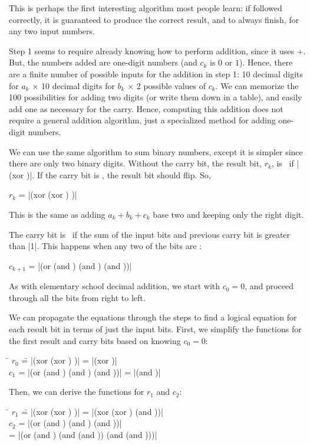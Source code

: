 \begin{schemeregion}
This is perhaps the first interesting algorithm most people learn: if followed correctly, it is guaranteed to produce the correct result, and to always finish, for any two input numbers.

Step 1 seems to require already knowing how to perform addition, since it uses $+$.  But, the numbers added are one-digit numbers (and $c_k$ is $0$ or $1$).  Hence, there are a finite number of possible inputs for the addition in step 1: 10 decimal digits for $a_k$ $\times$ 10 decimal digits for $b_k$ $\times$ 2 possible values of $c_k$.  We can memorize the 100 possibilities for adding two digits (or write them down in a table), and easily add one as necessary for the carry.  Hence, computing this addition does not require a general addition algorithm, just a specialized method for adding one-digit numbers.

We can use the same algorithm to sum binary numbers, except it is simpler since there are only two binary digits.  Without the carry bit, the result bit, $r_k$, is \bI\ if \scheme|(xor \ak \bk)|.  If the carry bit is \bI, the result bit should flip.  So,
\begin{centernospace}
$r_k$ = \scheme|(xor (xor \ak \bk) \ck)|
\end{centernospace}
This is the same as adding $a_k + b_k + c_k$ base two and keeping only the right digit.

The carry bit is \bI\ if the sum of the input bits and previous carry bit is greater than \schemeresult|1|.  This happens when any two of the bits are \bI:
\begin{centernospace}
$c_{k+1}$ = \scheme|(or (and \ak \bk) (and \ak \ck) (and \bk \ck))|
\end{centernospace}

As with elementary school decimal addition, we start with $c_{0} = 0$, and proceed through all the bits from right to left.

We can propagate the equations through the steps to find a logical equation for each result bit in terms of just the input bits.  First, we simplify the functions for the first result and carry bits based on knowing $c_0 = 0$:
\begin{tabbing}
\hspace{.2in} \= $r_0$ \= = \scheme|(xor (xor \az \bz) \cz)| = \scheme|(xor \az \bz)| \\
              \> $c_1$ \> = \scheme|(or (and \az \bz) (and \az \cz) (and \bz \cz))| = \scheme|(and \az \bz)|
\end{tabbing}
Then, we can derive the functions for $r_1$ and $c_2$:
\begin{tabbing}
\hspace{.2in} \= $r_1$ \= = \scheme|(xor (xor \aone \bone) \cone)| = \scheme|(xor (xor \aone \bone) (and \az \bz))|\\
              \> $c_2$ \> = \scheme|(or (and \aone \bone) (and \aone \cone) (and \bone \cone))| \\
              \>       \> = \scheme|(or (and \aone \bone) (and \aone (and \az \bz)) (and \bone (and \az \bz)))|
\end{tabbing}


\end{schemeregion}
